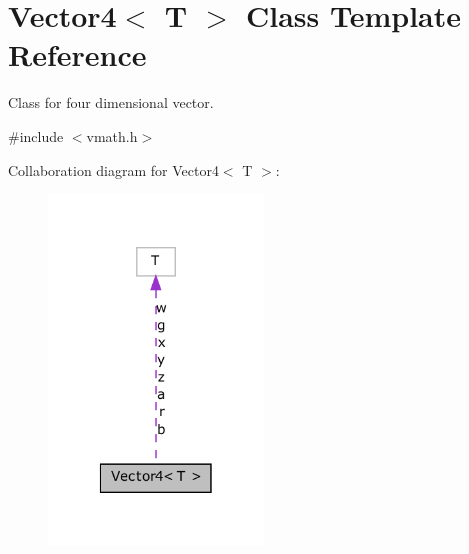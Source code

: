 \hypertarget{class_vector4}{
\section{Vector4$<$ T $>$ Class Template Reference}
\label{class_vector4}
}


Class for four dimensional vector.  




{\ttfamily \#include $<$vmath.h$>$}



Collaboration diagram for Vector4$<$ T $>$:\nopagebreak
\begin{figure}[H]
\begin{center}
\leavevmode
\includegraphics[width=162pt]{class_vector4__coll__graph}
\end{center}
\end{figure}
